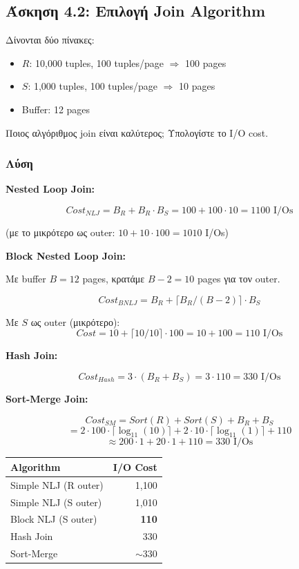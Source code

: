 \subsection{Άσκηση 4.2: Επιλογή Join Algorithm}

\begin{formulabox}[Εκφώνηση]
Δίνονται δύο πίνακες:
\begin{itemize}
    \item $R$: 10,000 tuples, 100 tuples/page $\Rightarrow$ 100 pages
    \item $S$: 1,000 tuples, 100 tuples/page $\Rightarrow$ 10 pages
    \item Buffer: 12 pages
\end{itemize}

Ποιος αλγόριθμος join είναι καλύτερος; Υπολογίστε το I/O cost.
\end{formulabox}

\subsubsection*{Λύση}

\textbf{Nested Loop Join:}

$$Cost_{NLJ} = B_R + B_R \cdot B_S = 100 + 100 \cdot 10 = 1100 \text{ I/Os}$$

(με το μικρότερο ως outer: $10 + 10 \cdot 100 = 1010$ I/Os)

\textbf{Block Nested Loop Join:}

Με buffer $B = 12$ pages, κρατάμε $B-2 = 10$ pages για τον outer.

$$Cost_{BNLJ} = B_R + \lceil B_R / (B-2) \rceil \cdot B_S$$

Με $S$ ως outer (μικρότερο):
$$Cost = 10 + \lceil 10/10 \rceil \cdot 100 = 10 + 100 = 110 \text{ I/Os}$$

\textbf{Hash Join:}

$$Cost_{Hash} = 3 \cdot (B_R + B_S) = 3 \cdot 110 = 330 \text{ I/Os}$$

\textbf{Sort-Merge Join:}

$$Cost_{SM} = Sort(R) + Sort(S) + B_R + B_S$$
$$= 2 \cdot 100 \cdot \lceil \log_{11}(10) \rceil + 2 \cdot 10 \cdot \lceil \log_{11}(1) \rceil + 110$$
$$\approx 200 \cdot 1 + 20 \cdot 1 + 110 = 330 \text{ I/Os}$$

\begin{center}
\begin{tabular}{lr}
\toprule
\textbf{Algorithm} & \textbf{I/O Cost} \\
\midrule
Simple NLJ (R outer) & 1,100 \\
Simple NLJ (S outer) & 1,010 \\
Block NLJ (S outer) & \textbf{110} \\
Hash Join & 330 \\
Sort-Merge & $\sim$330 \\
\bottomrule
\end{tabular}
\end{center}

